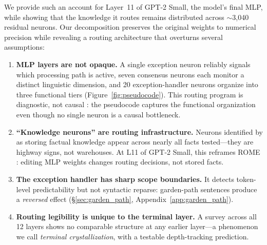 \documentclass{article}
\begin{document}
We provide such an account for Layer~11 of GPT-2 Small, the model's final MLP,
while showing that the knowledge it routes remains distributed across
$\sim$3{,}040 residual neurons.
Our decomposition preserves the original weights to numerical precision while
revealing a routing architecture that overturns several assumptions:

\begin{enumerate}
\item \textbf{MLP layers are not opaque.}
A single exception neuron reliably signals which processing path is active,
seven consensus neurons each monitor a distinct linguistic dimension, and
20 exception-handler neurons organize into three functional tiers
(Figure~\ref{fig:pseudocode}).
This routing program is diagnostic, not causal \citep{balogh2026discrete}:
the pseudocode captures the functional organization even though no single
neuron is a causal bottleneck.

\item \textbf{``Knowledge neurons'' are routing infrastructure.}
Neurons identified by \citet{dai2022knowledge} as storing factual knowledge
appear across nearly all facts tested---they are highway signs, not warehouses.
At L11 of GPT-2 Small, this reframes ROME \citep{meng2022locating}: editing
MLP weights changes routing decisions, not stored facts.

\item \textbf{The exception handler has sharp scope boundaries.}
It detects token-level predictability but not syntactic reparse: garden-path
sentences produce a \emph{reversed} effect (\S\ref{sec:garden_path},
Appendix~\ref{app:garden_path}).

\item \textbf{Routing legibility is unique to the terminal layer.}
A survey across all 12 layers shows no comparable structure at any earlier
layer---a phenomenon we call \emph{terminal crystallization}, with a testable
depth-tracking prediction.
\end{enumerate}
\end{document}
